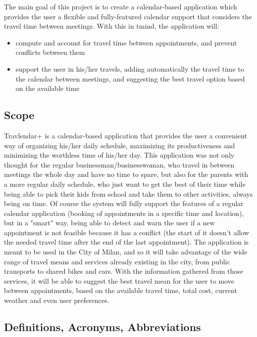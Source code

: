 \documentclass[12pt]{article}
\begin{document}
The main goal of this project is to create a calendar-based application which provides the user a flexible and fully-featured calendar support that considers the travel time between meetings. With this in tmind, the application will:
\begin{itemize}
\item compute and account for travel time between appointments, and prevent conflicts between them
\item support the user in his/her travels, adding automatically the travel time to the calendar between meetings, and suggesting the best travel option based on the available time
\end{itemize}

\subsection{Scope}
Travlendar+ is a calendar-based application that provides the user a convenient way of organizing his/her daily schedule, maximizing its productiveness and minimizing the worthless time of his/her day. This application was not only thought for the regular businessman/businesswoman, who travel in between meetings the whole day and have no time to spare, but also for the parents with a more regular daily schedule, who just want to get the best of their time while being able to pick their kids from school and take them to other activities, always being on time.
Of course the system will fully support the features of a regular calendar application (booking of appointments in a specific time and location), but in a "smart" way, being able to detect and warn the user if a new appointment is not feasible because it has a conflict (the start of it doesn't allow the needed travel time after the end of the last appointment). The application is meant to be used in the City of Milan, and so it will take advantage of the wide range of travel means and services already existing in the city, from public transports to shared bikes and cars. With the information gathered from those services, it will be able to suggest the best travel mean for the user to move between appointments, based on the available travel time, total cost, current weather and even user preferences.


\subsection{Definitions, Acronyms, Abbreviations}
\end{document}
